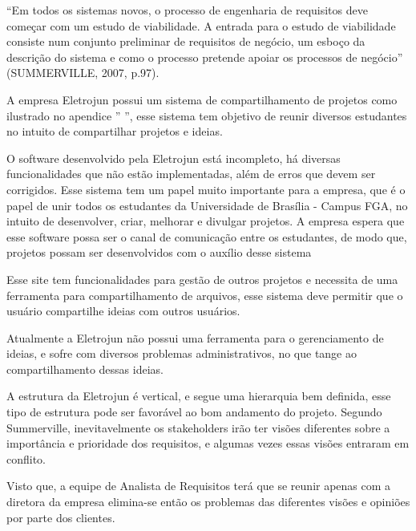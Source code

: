 “Em todos os sistemas novos, o processo de engenharia de requisitos deve começar com um estudo de viabilidade. A entrada para o estudo de viabilidade consiste num conjunto preliminar de requisitos de negócio, um esboço da descrição do sistema e como o processo pretende apoiar os processos de negócio” (SUMMERVILLE, 2007, p.97).
	
A empresa Eletrojun possui um sistema de compartilhamento de projetos como ilustrado no apendice '' ”, esse sistema tem objetivo de reunir diversos estudantes no intuito de compartilhar projetos e ideias.

O software desenvolvido pela Eletrojun está incompleto, há diversas funcionalidades que não estão implementadas, além de erros que devem ser corrigidos. Esse sistema tem um papel muito importante para a empresa, que é o papel de unir todos os estudantes da Universidade de Brasília - Campus FGA, no intuito de desenvolver, criar, melhorar e divulgar projetos. A empresa espera que esse software possa ser o canal de comunicação entre os estudantes, de modo que, projetos possam ser desenvolvidos com o auxílio desse sistema

Esse site tem funcionalidades para gestão de outros projetos e necessita de uma ferramenta para compartilhamento de arquivos, esse sistema deve permitir que o usuário compartilhe ideias com outros usuários.

Atualmente a Eletrojun não possui uma ferramenta para o gerenciamento de ideias, e sofre com diversos problemas administrativos, no que tange ao
compartilhamento dessas ideias.

A estrutura da Eletrojun é vertical, e segue uma hierarquia bem definida, esse tipo de estrutura pode ser favorável ao bom andamento do projeto. Segundo Summerville, inevitavelmente os stakeholders irão ter visões diferentes sobre a importância e prioridade dos requisitos, e algumas vezes essas visões entraram em conflito. 

Visto que, a equipe de Analista de Requisitos terá que se reunir apenas com a diretora da empresa elimina-se então os problemas das diferentes visões e opiniões por parte dos clientes. 
